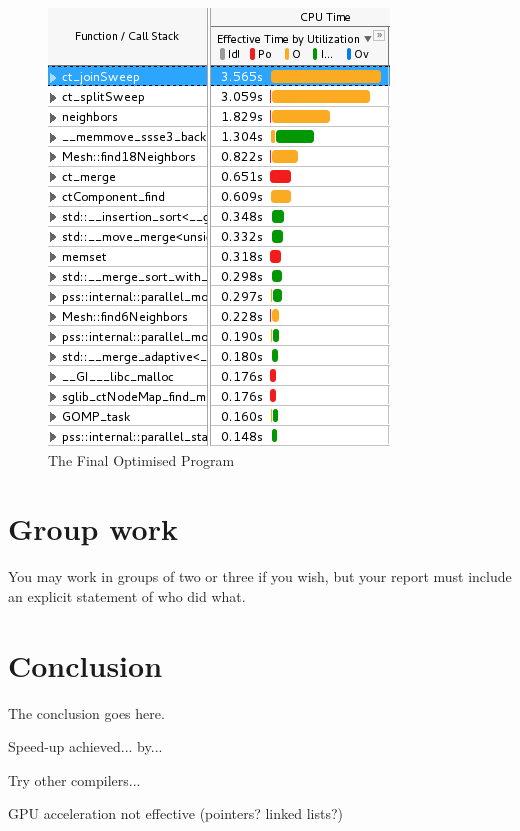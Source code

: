 \documentclass[conference]{IEEEtran}
\begin{document}
\begin{figure}[!h]
    \centering
    \includegraphics[width=\columnwidth]{opt_vtune}
    \caption{The Final Optimised Program}
    \label{fig:opt}
\end{figure}


\section{Group work}

You may work in groups of two or three if you wish, but your report must include an explicit statement of who did what.

\section{Conclusion}
The conclusion goes here.

Speed-up achieved... by...

Try other compilers...

GPU acceleration not effective (pointers? linked lists?)
\end{document}
